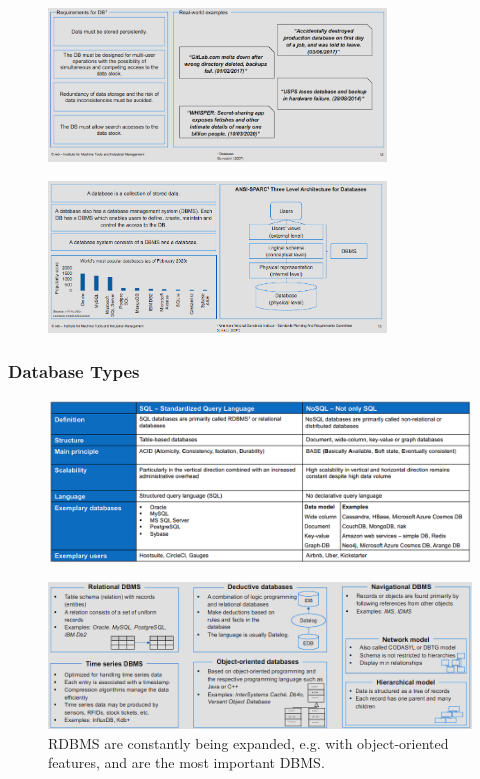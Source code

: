 \documentclass[12pt, a4paper, oneside, justified]{article}
\begin{document}
\begin{figure}[!h]
    \centering
    \includegraphics[width=0.8\textwidth]{../img/3-2.png}
    \label{img/3-2}
\end{figure}

\begin{figure}[!h]
    \centering
    \includegraphics[width=0.8\textwidth]{../img/3-3.png}
    \label{img/3-3}
\end{figure}

\subsubsection{Database Types}

\begin{figure}[!h]
    \centering
    \includegraphics[width=1\textwidth]{../img/3-20.png}
    \label{img/3-20}
\end{figure}


\begin{figure}[!h]
    \centering
    \includegraphics[width=1\textwidth]{../img/3-5.png}
    \caption{RDBMS are constantly being expanded, e.g. with object-oriented features, and are the most important DBMS.}
    \label{img/3-5}
\end{figure}
\end{document}
